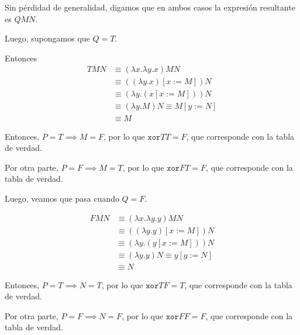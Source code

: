 \documentclass{article}
\begin{document}
\begin{enumerate}
{\begin{itemize}
{\begin{itemize}
{                            Sin pérdidad de generalidad, digamos que en ambos
                            casos la expresión resultante es $QMN$.

                            Luego, supongamos que $Q = T$. 

                            Entonces
                            \begin{align*}
                                TMN &\equiv (\lambda x. \lambda y. x) MN \\
                                &\equiv ((\lambda y. x)[x := M]) N \\
                                &\equiv (\lambda y. (x[x := M])) N \\
                                &\equiv (\lambda y. M) N \equiv M[y := N] \\
                                &\equiv M
                            \end{align*}

                            Entonces, $P = T \implies M = F$, por lo que
                            $\texttt{xor} T T = F$, que corresponde con la tabla
                            de verdad.

                            Por otra parte, $P = F \implies M = T$, por lo que
                            $\texttt{xor} F T = F$, que corresponde con la tabla
                            de verdad.

                            Luego, veamos que pasa cuando $Q = F$.

                            \begin{align*}
                                FMN &\equiv (\lambda x. \lambda y. y) MN \\
                                &\equiv ((\lambda y. y)[x := M]) N \\
                                &\equiv (\lambda y. (y[x := M])) N \\
                                &\equiv (\lambda y. y) N \equiv y[y := N] \\
                                &\equiv N
                            \end{align*}

                            Entonces, $P = T \implies N = T$, por lo que
                            $\texttt{xor} T F = T$, que corresponde con la tabla
                            de verdad.

                            Por otra parte, $P = F \implies N = F$, por lo que
                            $\texttt{xor} F F = F$, que corresponde con la tabla
                            de verdad.

}
\end{itemize}}
\end{itemize}}
\end{enumerate}
\end{document}
